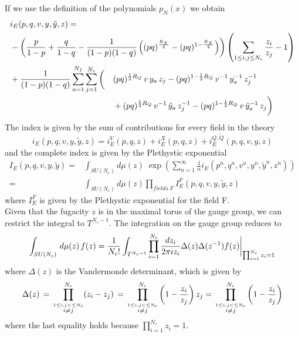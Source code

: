 If we use the definition of the polynomials $p_N(x)$ we obtain
\begin{equation}
\begin{aligned}
 & i_E (p,q,v, y,\tilde y ,z) = \\ 
 & 
	-\left({p \over 1-p}+{q \over 1-q} -{1 \over (1-p)(1-q)}
\left((p q)^{\frac{R_X}{2}}- (p q)^{1-\frac{R_X}{2}}\right)
\right) \left( \sum_{1\leq i,j \leq N_c} \frac{z_i}{z_j}-1\right ) \\ 
&
\begin{aligned}
&
+{1\over (1-p)(1-q)} \sum_{a=1}^{N_f} \sum_{j=1}^{N_c}
\bigg(
&&(p q)^{{1\over 2}R_Q} \, v \, y_a \, z_j
- (p q)^{1- {1\over 2} R_Q} \, v^{-1} \, y_a^{-1} \, z_j^{-1} \\
&
 && +
(p q)^{{1\over 2}R_Q}\, v^{-1}\, {\tilde y}_a \,z_j^{-1}
- (p q)^{1- {1\over 2}R_Q} \, v\, {\tilde y_a}^{-1}\, z_j\bigg) \\
\end{aligned}
\end{aligned}
\end{equation}
The index is given by the sum of contributions for every field in the theory
\begin{equation}
i_E(p,q,v,y,\tilde{y},z) = i_E^V(p,q,z) + i_E^{X} (p,q,z) + i_E^{Q,\tilde{Q}}(p,q,v,y,z)
\end{equation}
and the complete index is given by the Plethystic exponential
\begin{equation}
\begin{aligned}
I_E(p,q,v,y,\tilde{y}) = & \int_{SU(N_c)} d \mu(z) \; \exp \left( \sum_{n=1}^{\infty} \frac{1}{n} i_E(p^n,q^n,v^n,y^n,\tilde{y}^n,z^n) \right) \\
= & \int_{SU(N_c)} d \mu (z) \prod_{fields \; F } I_E^F(p,q,v,y,\tilde{y},z) 
\end{aligned}
\end{equation}
where $I_E^F$ is given by the Plethystic exponential for the field F.\\
Given that the fugacity $z$ is in the maximal torus of the gauge group, we can restrict the integral to $T^{N_c -1}$.
The integration on the gauge group reduces to
\begin{equation}
	\int_{SU(N_c)}\, d \mu(z) \, f(z) = {1 \over N_c!} \int_{T^{N_c-1}} \prod_{i=1}^{N_c }
	{ d z_i \over { 2 \pi i z_i} } \Delta (z) \Delta (z^{-1}) f(z) \bigg \rvert_{\prod_{i=1}^{N_c} z_i = 1}
 \end{equation}
 where $\Delta (z) $ is the Vandermonde determinant, which is given by
 $$
 \Delta (z ) \, = \, \prod_{ \overset{1 \leq i,j< \leq N_c} { i \neq j}}^{N_c} ( z_i - z_j) \, = \,  \prod_{ \overset{1 \leq i,j< \leq N_c} { i \neq j}}^{N_c}\bigg ( 1 - {z_i \over  z_j } \bigg) \, z_j = \,  \prod_{ \overset{1 \leq i,j< \leq N_c} { i \neq j}}^{N_c}\bigg ( 1 - {z_i \over  z_j } \bigg)
 $$
where the last equality holds because $ \prod_{i=1}^{N_c} z_i = 1$.
 
